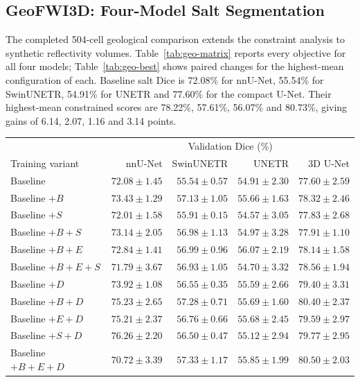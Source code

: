 \documentclass[12pt,a4paper]{article}
\begin{document}
\subsection{GeoFWI3D: Four-Model Salt Segmentation}
\label{sec:geo-results}

The completed 504-cell geological comparison extends the constraint
analysis to synthetic reflectivity volumes. Table~\ref{tab:geo-matrix}
reports every objective for all four models; Table~\ref{tab:geo-best}
shows paired changes for the highest-mean configuration of each.
Baseline salt Dice is 72.08\% for nnU-Net, 55.54\% for SwinUNETR,
54.91\% for UNETR and 77.60\% for the compact U-Net. Their
highest-mean constrained scores are 78.22\%, 57.61\%, 56.07\% and
80.73\%, giving gains of 6.14, 2.07, 1.16 and 3.14 points.

\begin{table}[htbp]
\centering\small{}
\setlength{\tabcolsep}{5pt}
\renewcommand{\arraystretch}{1.15}
\begin{tabular}{@{}lrrrr@{}}
\hline
 & \multicolumn{4}{c}{Validation Dice (\%)} \\
Training variant & nnU-Net & SwinUNETR & UNETR & 3D U-Net \\
\hline
Baseline & $72.08\pm1.45$ & $55.54\pm0.57$ & $54.91\pm2.30$ & $77.60\pm2.59$ \\
Baseline $+B$ & $73.43\pm1.29$ & $57.13\pm1.05$ & $55.66\pm1.63$ & $78.32\pm2.46$ \\
Baseline $+S$ & $72.01\pm1.58$ & $55.91\pm0.15$ & $54.57\pm3.05$ & $77.83\pm2.68$ \\
Baseline $+B+S$ & $73.14\pm2.05$ & $56.98\pm1.13$ & $54.97\pm3.28$ & $77.91\pm1.10$ \\
Baseline $+B+E$ & $72.84\pm1.41$ & $56.99\pm0.96$ & $\mathbf{56.07\pm2.19}$ & $78.14\pm1.58$ \\
Baseline $+B+E+S$ & $71.79\pm3.67$ & $56.93\pm1.05$ & $54.70\pm3.32$ & $78.56\pm1.94$ \\
Baseline $+D$ & $73.92\pm1.08$ & $56.55\pm0.35$ & $55.59\pm2.66$ & $79.40\pm3.31$ \\
Baseline $+B+D$ & $75.23\pm2.65$ & $57.28\pm0.71$ & $55.69\pm1.60$ & $80.40\pm2.37$ \\
Baseline $+E+D$ & $75.21\pm2.37$ & $56.76\pm0.66$ & $55.68\pm2.45$ & $79.59\pm2.97$ \\
Baseline $+S+D$ & $76.26\pm2.20$ & $56.50\pm0.47$ & $55.12\pm2.94$ & $79.77\pm2.95$ \\
Baseline $+B+E+D$ & $70.72\pm3.39$ & $57.33\pm1.17$ & $55.85\pm1.99$ & $80.50\pm2.03$ \\

\end{tabular}
\end{table}
\end{document}
